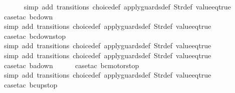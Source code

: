 \begin{isabellebody}
\ \ \ \ \ \isamarkupfalse%
\ {\isacharparenleft}simp\ add{\isacharcolon}\ transitions\ choice{\isacharunderscore}def\ apply{\isacharunderscore}guards{\isacharunderscore}def\ Str{\isacharunderscore}def\ value{\isacharunderscore}eq{\isacharunderscore}true{\isacharparenright}\isanewline
\ \ \ \ \isamarkupfalse%
\ {\isacharparenleft}case{\isacharunderscore}tac\ {\isachardoublequoteopen}bc{\isacharequal}down{}{}{\isachardoublequoteclose}{\isacharparenright}\isanewline
\ \ \ \ \ \isamarkupfalse%
\ {\isacharparenleft}simp\ add{\isacharcolon}\ transitions\ choice{\isacharunderscore}def\ apply{\isacharunderscore}guards{\isacharunderscore}def\ Str{\isacharunderscore}def\ value{\isacharunderscore}eq{\isacharunderscore}true{\isacharparenright}\isanewline
\ \ \ \ \isamarkupfalse%
\ {\isacharparenleft}case{\isacharunderscore}tac\ {\isachardoublequoteopen}bc{\isacharequal}down{}{}stop{\isachardoublequoteclose}{\isacharparenright}\isanewline
\ \ \ \ \ \isamarkupfalse%
\ {\isacharparenleft}simp\ add{\isacharcolon}\ transitions\ choice{\isacharunderscore}def\ apply{\isacharunderscore}guards{\isacharunderscore}def\ Str{\isacharunderscore}def\ value{\isacharunderscore}eq{\isacharunderscore}true{\isacharparenright}\isanewline
\ \ \isamarkupfalse%
\ {\isacharparenleft}simp\ add{\isacharcolon}\ transitions\ choice{\isacharunderscore}def\ apply{\isacharunderscore}guards{\isacharunderscore}def\ Str{\isacharunderscore}def\ value{\isacharunderscore}eq{\isacharunderscore}true{\isacharparenright}\isanewline
\ \isamarkupfalse%
\ {\isacharparenleft}case{\isacharunderscore}tac\ {\isachardoublequoteopen}ba{\isacharequal}down{}{}{\isachardoublequoteclose}{\isacharparenright}\isanewline
\ \ \ \ \isamarkupfalse%
\ {\isacharparenleft}case{\isacharunderscore}tac\ {\isachardoublequoteopen}bc{\isacharequal}motorstop{}{\isachardoublequoteclose}{\isacharparenright}\isanewline
\ \ \ \ \ \isamarkupfalse%
\ {\isacharparenleft}simp\ add{\isacharcolon}\ transitions\ choice{\isacharunderscore}def\ apply{\isacharunderscore}guards{\isacharunderscore}def\ Str{\isacharunderscore}def\ value{\isacharunderscore}eq{\isacharunderscore}true{\isacharparenright}\isanewline
\ \ \ \ \isamarkupfalse%
\ {\isacharparenleft}case{\isacharunderscore}tac\ {\isachardoublequoteopen}bc{\isacharequal}up{}{}stop{\isachardoublequoteclose}{\isacharparenright}\isanewline

\end{isabellebody}
